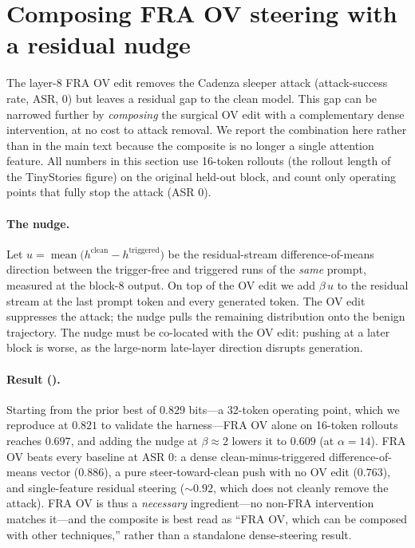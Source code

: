 \documentclass{article} %
\theoremstyle{plain}
\theoremstyle{definition}
\theoremstyle{remark}
\begin{document}
\section{Composing FRA OV steering with a residual nudge}
\label{app:cadenza_compose}

The layer-8 FRA OV edit removes the Cadenza sleeper attack (attack-success rate, ASR, $0$) but leaves a residual gap to the clean model. This gap can be narrowed further by \emph{composing} the surgical OV edit with a complementary dense intervention, at no cost to attack removal. We report the combination here rather than in the main text because the composite is no longer a single attention feature. All numbers in this section use 16-token rollouts (the rollout length of the TinyStories figure) on the original held-out block, and count only operating points that fully stop the attack (ASR $0$).

\paragraph{The nudge.} Let $u = \operatorname{mean}\big(h^{\mathrm{clean}} - h^{\mathrm{triggered}}\big)$ be the residual-stream difference-of-means direction between the trigger-free and triggered runs of the \emph{same} prompt, measured at the block-8 output. On top of the OV edit we add $\beta\,u$ to the residual stream at the last prompt token and every generated token. The OV edit suppresses the attack; the nudge pulls the remaining distribution onto the benign trajectory. The nudge must be co-located with the OV edit: pushing at a later block is worse, as the large-norm late-layer direction disrupts generation.

\paragraph{Result ().} Starting from the prior best of $0.829$ bits---a 32-token operating point, which we reproduce at $0.821$ to validate the harness---FRA OV alone on 16-token rollouts reaches $0.697$, and adding the nudge at $\beta\approx2$ lowers it to $\mathbf{0.609}$ (at $\alpha{=}14$). FRA OV beats every baseline at ASR $0$: a dense clean-minus-triggered difference-of-means vector ($0.886$), a pure steer-toward-clean push with no OV edit ($0.763$), and single-feature residual steering ($\sim0.92$, which does not cleanly remove the attack). FRA OV is thus a \emph{necessary} ingredient---no non-FRA intervention matches it---and the composite is best read as ``FRA OV, which can be composed with other techniques,'' rather than a standalone dense-steering result.
\end{document}

